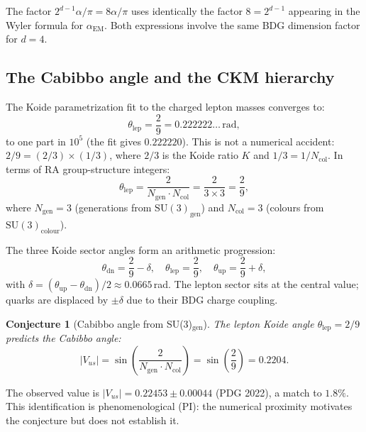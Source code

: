 \documentclass[11pt]{article}
\newtheorem{conjecture}{Conjecture}
\begin{document}
The factor $2^{d-1}\alpha/\pi=8\alpha/\pi$ uses identically the factor $8=2^{d-1}$ appearing in the Wyler formula for $\alpha_{\mathrm{EM}}$. Both expressions involve the same BDG dimension factor for $d=4$.

\subsection{The Cabibbo angle and the CKM hierarchy}
\label{sec:ckm}

The Koide parametrization fit to the charged lepton masses converges to:
\begin{equation}
\theta_{\mathrm{lep}} = \frac{2}{9} = 0.222222\ldots\,\mathrm{rad},
\end{equation}
to one part in $10^5$ (the fit gives $0.222220$). This is not a numerical accident: $2/9=(2/3)\times(1/3)$, where $2/3$ is the Koide ratio $K$ and $1/3=1/N_{\mathrm{col}}$. In terms of RA group-structure integers:
\begin{equation}
\theta_{\mathrm{lep}} = \frac{2}{N_{\mathrm{gen}}\cdot N_{\mathrm{col}}} = \frac{2}{3\times 3} = \frac{2}{9},
\end{equation}
where $N_{\mathrm{gen}}=3$ (generations from $\mathrm{SU}(3)_{\mathrm{gen}}$) and $N_{\mathrm{col}}=3$ (colours from $\mathrm{SU}(3)_{\mathrm{colour}}$).

The three Koide sector angles form an arithmetic progression:
\begin{equation}
\theta_{\mathrm{dn}} = \frac{2}{9}-\delta,\quad \theta_{\mathrm{lep}}=\frac{2}{9},\quad \theta_{\mathrm{up}}=\frac{2}{9}+\delta,
\end{equation}
with $\delta=(\theta_{\mathrm{up}}-\theta_{\mathrm{dn}})/2\approx 0.0665$\,rad. The lepton sector sits at the central value; quarks are displaced by $\pm\delta$ due to their BDG charge coupling.

\begin{conjecture}[Cabibbo angle from SU(3)$_{\mathrm{gen}}$]
\label{conj:cabibbo}
The lepton Koide angle $\theta_{\mathrm{lep}}=2/9$ predicts the Cabibbo angle:
\begin{equation}
|V_{us}| = \sin\!\left(\frac{2}{N_{\mathrm{gen}}\cdot N_{\mathrm{col}}}\right) = \sin\!\left(\frac{2}{9}\right) = 0.2204.
\end{equation}
\end{conjecture}

The observed value is $|V_{us}|=0.22453\pm 0.00044$ (PDG 2022), a match to $1.8\%$. This identification is phenomenological (PI): the numerical proximity motivates the conjecture but does not establish it.
\end{document}
